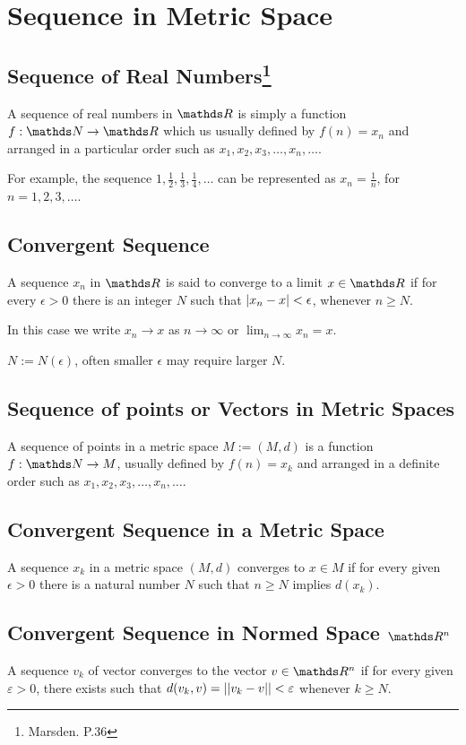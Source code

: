 \documentclass[../main-sheet.tex]{subfiles}
\begin{document}
\chapter{Sequence in Metric Space}
\section[Sequence of Real Numbers]{Sequence of Real Numbers\footnote{Marsden. P.36}}
A sequence of real numbers in $ \R $ is simply a function $ f:\N\to\R $ which us usually defined by $ f(n)=x_n $ and arranged in a particular order such as $ x_1,x_2,x_3,\dots,x_n,\dots $.

For example, the sequence $ 1,\frac{1}{2},\frac{1}{3},\frac{1}{4},\dots $ can be represented as $ x_n=\frac{1}{n} $, for $ n=1,2,3,\dots $.

\section{Convergent Sequence}
A sequence $ x_n $ in $ \R  $ is said to converge to a limit $ x\in \R $ if for every $ \epsilon>0 $ there is an integer $ N $ such that $ \left\vert x_n-x\right\vert<\epsilon $, whenever $ n\geq N $.

In this case we write $ x_n\to x $ as $ n\to \infty $ or $ \displaystyle \lim_{n\to \infty}x_n=x $.
\begin{note}
    $ N:=N(\epsilon) $, often smaller $ \epsilon  $ may require larger $ N $.
\end{note}
\section{Sequence of points or Vectors in Metric Spaces}
A sequence of points in a metric space $ M:=(M,d) $ is a function $ f:\N\to M $, usually defined by $ f(n)=x_k $ and arranged in a definite order such as $ x_1,x_2,x_3,\dots,x_n,\dots $.
\section{Convergent Sequence in a Metric Space}
A sequence $ x_k $ in a metric space $ (M,d) $ converges to $ x\in M $ if for every given $ \epsilon>0 $ there is a natural number $ N $ such that $ n\geq N $ implies $ d(x_k) $.
\section{Convergent Sequence in Normed Space $ \R^n $}
A sequence $ v_k $ of vector converges to the vector $ v\in\R^n $ if for every given $ \varepsilon>0 $, there exists such that $ d(v_k,v)=\left\vert\left\vert v_k-v\right\vert\right\vert<\varepsilon $ whenever $ k\geq N $.
\end{document}
